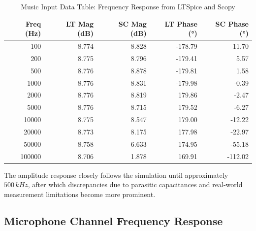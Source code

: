 \documentclass[12pt]{article}
\begin{document}
\begin{table}[H]
	\centering
	\footnotesize
	\caption{Music Input Data Table: Frequency Response from LTSpice and Scopy}
	\label{tab:music_data}
	\renewcommand{\arraystretch}{.9}
	\begin{tabular}{|r|r|r|r|r|}
		\hline
		\textbf{Freq (Hz)} & \textbf{LT Mag (dB)} & \textbf{SC Mag (dB)} & \textbf{LT Phase (°)} & \textbf{SC Phase (°)} \\ \hline
		100                & 8.774                & 8.828                & -178.79               & 11.70                 \\ \hline
		200                & 8.775                & 8.796                & -179.41               & 5.57                  \\ \hline
		500                & 8.776                & 8.878                & -179.81               & 1.58                  \\ \hline
		1000               & 8.776                & 8.831                & -179.98               & -0.39                 \\ \hline
		2000               & 8.776                & 8.819                & 179.86                & -2.47                 \\ \hline
		5000               & 8.776                & 8.715                & 179.52                & -6.27                 \\ \hline
		10000              & 8.775                & 8.547                & 179.00                & -12.22                \\ \hline
		20000              & 8.773                & 8.175                & 177.98                & -22.97                \\ \hline
		50000              & 8.758                & 6.633                & 174.95                & -55.18                \\ \hline
		100000             & 8.706                & 1.878                & 169.91                & -112.02               \\ \hline
	\end{tabular}
\end{table}
The amplitude response closely follows the simulation until approximately $500\,kHz$, after which discrepancies due to parasitic capacitances and real-world measurement limitations become more prominent.

\subsection{Microphone Channel Frequency Response}
\end{document}
